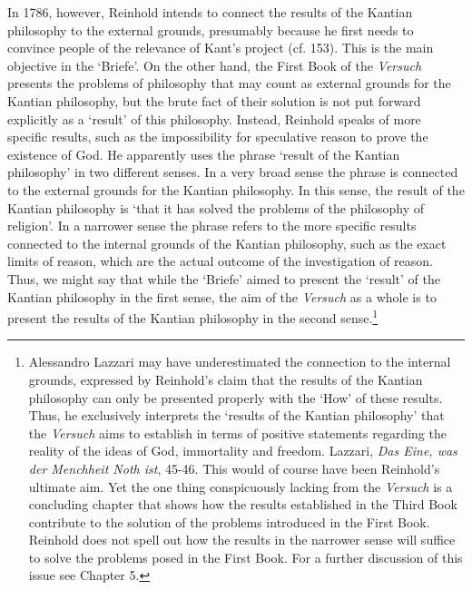 In 1786, however, Reinhold intends to connect the results of the Kantian philosophy to the external grounds, presumably because he first needs to convince people of the relevance of Kant's project (cf. 153). This is the main objective in the `Briefe'. On the other hand, the First Book of the \textit{Versuch} presents the problems of philosophy that may count as external grounds for the Kantian philosophy, but the brute fact of their solution is not put forward explicitly as a `result' of this philosophy. Instead, Reinhold speaks of more specific results, such as the impossibility for speculative reason to prove the existence of God. He apparently uses the phrase `result of the Kantian philosophy' in two different senses. In a very broad sense the phrase is connected to the external grounds for the Kantian philosophy. In this sense, the result of the Kantian philosophy is `that it has solved the problems of the philosophy of religion'. In a narrower sense the phrase refers to the more specific results connected to the internal grounds of the Kantian philosophy, such as the exact limits of reason, which are the actual outcome of the investigation of reason. Thus, we might say that while the `Briefe' aimed to present the `result' of the Kantian philosophy in the first sense, the aim of the \textit{Versuch} as a whole is to present the results of the Kantian philosophy in the second sense.\footnote{ Alessandro Lazzari may have underestimated the connection to the internal grounds, expressed by Reinhold's claim that the results of the Kantian philosophy can only be presented properly with the `How' of these results. Thus, he exclusively interprets the `results of the Kantian philosophy' that the \textit{Versuch} aims to establish in terms of positive statements regarding the reality of the ideas of God, immortality and freedom. Lazzari, \textit{Das Eine, was der Menchheit Noth ist}, 45{-}46. This would of course have been Reinhold's ultimate aim. Yet the one thing conspicuously lacking from the \textit{Versuch} is a concluding chapter that shows how the results established in the Third Book contribute to the solution of the problems introduced in the First Book. Reinhold does not spell out how the results in the narrower sense will suffice to solve the problems posed in the First Book. For a further discussion of this issue see Chapter 5. } 

